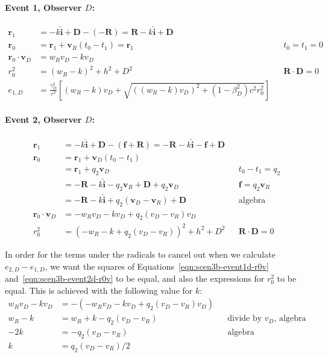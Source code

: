 \documentclass[a4paper]{article}
\theoremstyle{plain}
\theoremstyle{definition}
\newcommand{\vect}[1]{\mathbf{#1}}
\newcommand{\hatvec}[1]{\hat{\mathbf{#1}}}
\begin{document}
\paragraph{Event 1, Observer $D$:}

\begin{align}
\vect{r}_1 & = -k\hatvec{i} + \vect{D} - (-\vect{R}) = \vect{R} - k\hatvec{i} + \vect{D} \nonumber \\
\vect{r}_0 & = \vect{r}_1 + \vect{v}_R (t_0 - t_1) = \vect{r}_1 & & \text{$t_0=t_1=0$} \nonumber \\
\vect{r}_0 \cdot \vect{v}_D & = w_Rv_D - kv_D \label{eqn:scen3b-event1d-r0v} \\
r_0^2 & = (w_R-k)^2 + h^2 + D^2 & & \text{$\vect{R} \cdot \vect{D} = 0$} \nonumber \\
e_{1,D} & = \frac{\gamma_D^2}{c^2} \left[ (w_R-k)v_D + \sqrt{ ((w_R-k)v_D)^2 + (1-\beta_D^2)c^2r_0^2 } \right] \nonumber
\end{align}


\paragraph{Event 2, Observer $D$:}

\begin{align}
\vect{r}_1 & = -k\hatvec{i} + \vect{D} - (\vect{f} + \vect{R}) = -\vect{R} - k\hatvec{i} - \vect{f} + \vect{D} \nonumber \\
\vect{r}_0
  & = \vect{r}_1 + \vect{v}_D (t_0 - t_1) \nonumber \\
  & = \vect{r}_1 + q_2 \vect{v}_D & & \text{$t_0 - t_1 = q_2$} \nonumber \\
  & = - \vect{R} - k\hatvec{i} - q_2\vect{v}_R + \vect{D} + q_2 \vect{v}_D & & \text{$\vect{f} = q_2 \vect{v}_R$} \nonumber \\
  & = - \vect{R} - k\hatvec{i} + q_2 (\vect{v}_D - \vect{v}_R) + \vect{D} & & \text{algebra} \nonumber \\
\vect{r}_0 \cdot \vect{v}_D & = - w_Rv_D - kv_D + q_2(v_D-v_R)v_D \label{eqn:scen3b-event2d-r0v} \\
r_0^2
  & = (-w_R - k + q_2(v_D-v_R))^2 + h^2 + D^2 & & \text{$\vect{R} \cdot \vect{D} = 0$} \nonumber
\end{align}

In order for the terms under the radicals to cancel out when we
calculate $e_{2,D} - e_{1,D}$, we want
the squares of Equations~\eqref{eqn:scen3b-event1d-r0v}
and~\eqref{eqn:scen3b-event2d-r0v} to be equal, and also the
expressions for $r_0^2$ to be equal.
This is achieved with the following value for $k$:
\begin{align*}
w_Rv_D - kv_D & = -(- w_Rv_D - kv_D + q_2(v_D-v_R)v_D) \\
w_R - k & = w_R + k - q_2(v_D-v_R) & & \text{divide by $v_D$, algebra} \\
-2k & = -q_2(v_D-v_R) & & \text{algebra} \\
k & = q_2(v_D-v_R)/2 \\
\end{align*}
\end{document}
